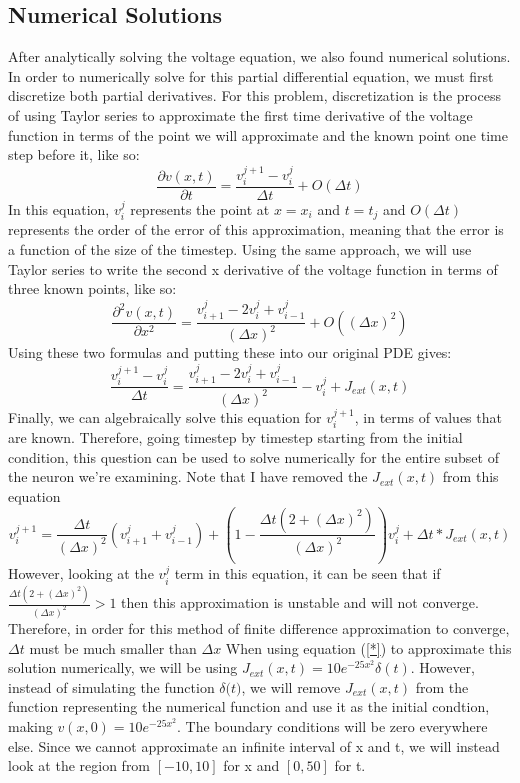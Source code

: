 \documentclass[12pt]{article}
\begin{document}
\subsection{Numerical Solutions}
After analytically solving the voltage equation, we also found numerical solutions. In order to numerically solve for this partial differential equation, we must first discretize both partial derivatives. For this problem, discretization is the process of using Taylor series to approximate the first time derivative of the voltage function in terms of the point we will approximate and the known point one time step before it, like so:
\[\frac{\partial{v(x,t)}}{\partial{t}}=\frac{v^{j+1}_i-v^j_i}{\Delta{t}}+O(\Delta{t})\]
In this equation, $v^j_i$ represents the point at $x=x_i$ and $t=t_j$ and $O(\Delta{t})$ represents the order of the error of this approximation, meaning that the error is a function of the size of the timestep.
Using the same approach, we will use Taylor series to write the second x derivative of the voltage function in terms of three known points, like so:
\[\frac{\partial^2{v(x,t)}}{\partial{x}^2}=\frac{v^{j}_{i+1}-2v^j_i+v^j_{i-1}}{(\Delta{x})^2}+O((\Delta{x})^2)\]
Using these two formulas and putting these into our original PDE gives:
\[\frac{v^{j+1}_i-v^j_i}{\Delta{t}}=\frac{v^{j}_{i+1}-2v^j_i+v^j_{i-1}}{(\Delta{x})^2}-v^j_i+J_{ext}(x,t)\]
Finally, we can algebraically solve this equation for $v^{j+1}_i$, in terms of values that are known. Therefore, going timestep by timestep starting from the initial condition, this question can be used to solve numerically for the entire subset of the neuron we're examining. Note that I have removed the $J_{ext}(x,t)$ from this equation
\begin{equation} \label{*}
v^{j+1}_i=\frac{\Delta{t}}{(\Delta{x})^2}(v^{j}_{i+1}+v^{j}_{i-1})+(1-\frac{\Delta{t}(2+(\Delta{x})^2)}{(\Delta{x})^2})v^{j}_{i}+\Delta{t}*J_{ext}(x,t)
\end {equation}
However, looking at the $v^{j}_{i}$ term in this equation, it can be seen that if $\frac{\Delta{t}(2+(\Delta{x})^2)}{(\Delta{x})^2}>1$ then this approximation is unstable and will not converge. Therefore, in order for this method of finite difference approximation to converge, $\Delta{t}$ must be much smaller than $\Delta{x}$ 
When using equation (\ref{*}) to approximate this solution numerically, we will be using $J_{ext}(x,t)=10e^{-25x^2}\delta{(t)}$. However, instead of simulating the function $\delta{(t})$, we will remove $J_{ext}(x,t)$ from the function representing the numerical function and use it as the initial condtion, making $v(x,0)=10e^{-25x^2}$. The boundary conditions will be zero everywhere else. Since we cannot approximate an infinite interval of x and t, we will instead look at the region from $[-10,10]$ for x and $[0,50]$ for t. 
\end{document}
